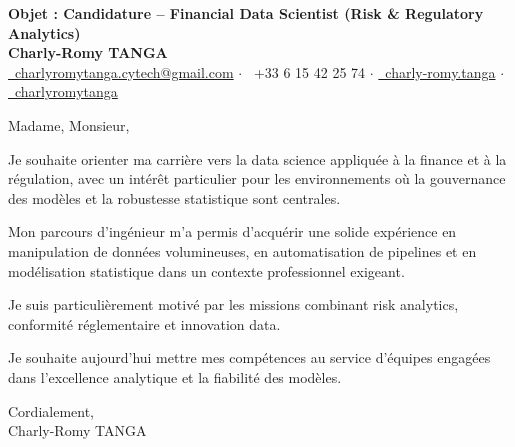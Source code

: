\documentclass[10pt, letterpaper]{article}
\begin{document}
\begin{center}
\textbf{\LARGE Objet : Candidature -- Financial Data Scientist (Risk \& Regulatory Analytics)}\\[0.2cm]
\textbf{\large Charly-Romy TANGA}\\[0.2cm]
\href{mailto:charlyromytanga.cytech@gmail.com}{\faEnvelope\ charlyromytanga.cytech@gmail.com} \quad$\cdot$\quad
\faPhone\ +33 6 15 42 25 74 \quad$\cdot$\quad
\href{https://www.linkedin.com/in/charly-romy-tanga}{\faLinkedin\ charly-romy.tanga} \quad$\cdot$\quad
\href{https://github.com/charlyromytanga}{\faGithub\ charlyromytanga}
\end{center}
Madame, Monsieur,

Je souhaite orienter ma carrière vers la data science appliquée à la finance et à la régulation, avec un intérêt particulier pour les environnements où la gouvernance des modèles et la robustesse statistique sont centrales.

Mon parcours d'ingénieur m'a permis d'acquérir une solide expérience en manipulation de données volumineuses, en automatisation de pipelines et en modélisation statistique dans un contexte professionnel exigeant.

Je suis particulièrement motivé par les missions combinant risk analytics, conformité réglementaire et innovation data.

Je souhaite aujourd'hui mettre mes compétences au service d'équipes engagées dans l'excellence analytique et la fiabilité des modèles.

Cordialement,\\
Charly-Romy TANGA
\end{document}
